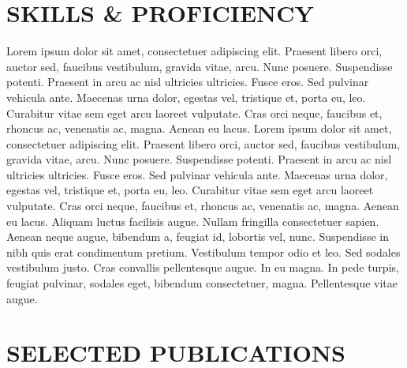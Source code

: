 \documentclass[9pt]{orbit-cv}
\begin{document}
\section{\faRocket{} SKILLS \& PROFICIENCY}
Lorem ipsum dolor sit amet, consectetuer adipiscing elit. Praesent libero orci, auctor sed, faucibus vestibulum, gravida vitae, arcu. Nunc posuere. Suspendisse potenti. Praesent in arcu ac nisl ultricies ultricies. Fusce eros. Sed pulvinar vehicula ante. Maecenas urna dolor, egestas vel, tristique et, porta eu, leo. Curabitur vitae sem eget arcu laoreet vulputate. Cras orci neque, faucibus et, rhoncus ac, venenatis ac, magna. Aenean eu lacus. 
Lorem ipsum dolor sit amet, consectetuer adipiscing elit. Praesent libero orci, auctor sed, faucibus vestibulum, gravida vitae, arcu. Nunc posuere. Suspendisse potenti. Praesent in arcu ac nisl ultricies ultricies. Fusce eros. Sed pulvinar vehicula ante. Maecenas urna dolor, egestas vel, tristique et, porta eu, leo. Curabitur vitae sem eget arcu laoreet vulputate. Cras orci neque, faucibus et, rhoncus ac, venenatis ac, magna. Aenean eu lacus. Aliquam luctus facilisis augue. Nullam fringilla consectetuer sapien. Aenean neque augue, bibendum a, feugiat id, lobortis vel, nunc. Suspendisse in nibh quis erat condimentum pretium. Vestibulum tempor odio et leo. Sed sodales vestibulum justo. Cras convallis pellentesque augue. In eu magna. In pede turpis, feugiat pulvinar, sodales eget, bibendum consectetuer, magna. Pellentesque vitae augue.
\ListSkills{}
%


\section{\faBook{} SELECTED PUBLICATIONS}






\end{document}
